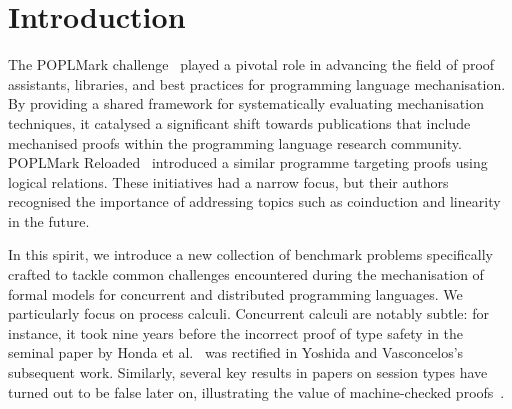 \documentclass[runningheads]{llncs}
\begin{document}
\section{Introduction}
The POPLMark challenge~\cite{POPLMark}
played a pivotal role in advancing the field of proof assistants,
libraries, and best practices for programming language
mechanisation. By providing a shared framework for systematically
evaluating mechanisation techniques, it catalysed a significant
shift towards publications that include mechanised proofs within the programming language research community.
POPLMark Reloaded~\cite{POPLMarkReloaded} introduced a similar programme targeting proofs using logical relations.
These initiatives had a narrow focus, but their authors recognised the importance of addressing topics such as coinduction and linearity in the future.

In this spirit, we introduce a new collection of benchmark problems
specifically crafted to tackle common challenges encountered during
the mechanisation of formal models for concurrent and distributed
programming languages.
We particularly focus on process calculi.
Concurrent calculi are notably subtle: for instance, it took nine
years before the incorrect proof of type safety in the seminal paper
by Honda et al.~\cite{Honda1998} was rectified in Yoshida and
Vasconcelos’s subsequent work\cite{Yoshida2007}.
Similarly, several key results in papers on session types have turned out
to be false later on, illustrating the
value of machine-checked proofs~\cite{Gay2020,10.1145/3290343}.
\end{document}
